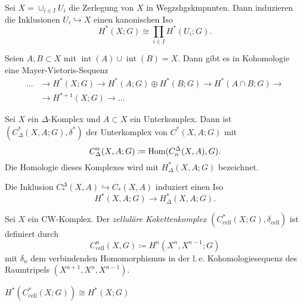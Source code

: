 \documentclass{cheat-sheet}
\DeclareMathOperator{\inte}{int} %
\newcommand{\cell}{\text{cell}} %
\begin{document}

\begin{prop}
  Sei $X = \cup_{i \in I} U_i$ die Zerlegung von $X$ in Wegzshgskmpnnten. Dann induzieren die Inklusionen $U_i \hookrightarrow X$ einen kanonischen Iso
  \[ H^*(X; G) \cong \prod_{i \in I} H^*(U_i; G). \]
\end{prop}

\begin{satz}
  Seien $A, B \subset X$ mit $\inte(A) \cup \inte(B) = X$. Dann gibt es in Kohomologie eine Mayer-Vietoris-Sequenz
  \begin{align*}
    \ldots & \to H^*(X; G) \to H^*(A; G) \oplus H^*(B; G) \to H^*(A \cap B; G) \to \\
    & \to H^{*+1}(X; G) \to \ldots
  \end{align*}
\end{satz}

\begin{defn}
  Sei $X$ ein $\Delta$-Komplex und $A \subset X$ ein Unterkomplex. Dann ist $(C^*_\Delta(X, A; G), \delta^*)$ der Unterkomplex von $C^*(X, A; G)$ mit
  \[ C^n_\Delta(X, A; G) \coloneqq \operatorname{Hom}(C^\Delta_n(X, A), G). \]
  Die Homologie dieses Komplexes wird mit $H^*_\Delta(X, A; G)$ bezeichnet.
\end{defn}

\begin{prop}
  Die Inklusion $C_*^\Delta(X, A) \hookrightarrow C_*(X, A)$ induziert einen Iso
  \[ H^*(X, A; G) \to H^*_\Delta(X, A; G). \]
\end{prop}


\begin{defn}
  Sei $X$ ein CW-Komplex. Der \emph{zelluläre Kokettenkomplex} $(C^*_\cell(X; G), \delta_\cell)$ ist definiert durch
  \[ C^n_\cell(X, G) \coloneqq H^n(X^n, X^{n-1}; G) \]
  mit $\delta_n$ dem verbindenden Homomorphismus in der l.\,e. Kohomologiesequenz des Raumtripels $(X^{n+1}, X^n, X^{n-1})$.
\end{defn}

\begin{prop}
  $H^*(C^*_\cell(X; G)) \cong H^*(X; G)$
\end{prop}


\end{document}
